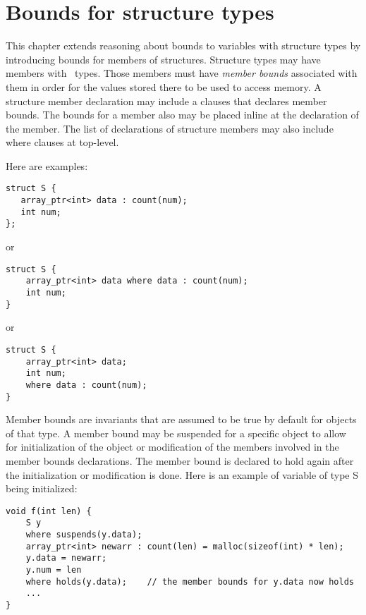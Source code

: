 
\chapter{Bounds for structure types}
\label{chapter:structure-bounds}

This chapter extends reasoning about bounds to variables with structure
types by introducing bounds for members of structures.   
Structure types may have members with \arrayptr\ types. Those
members must have \emph{member bounds} associated with them in order for
the values stored there to be used to access memory. A structure member
declaration may include a  clauses that declares member
bounds. The bounds for a member also may be placed inline at the
declaration of the member. The list of declarations of structure members
may also include where clauses at top-level. 

Here are examples:

\begin{verbatim}
struct S {
   array_ptr<int> data : count(num);
   int num;
};
\end{verbatim}

or

\begin{verbatim}
struct S {
    array_ptr<int> data where data : count(num);
    int num;
}
\end{verbatim}

or

\begin{verbatim}
struct S {
    array_ptr<int> data;
    int num;
    where data : count(num);
}
\end{verbatim}

Member bounds are invariants that are assumed to be true by default for
objects of that type. A member bound may be suspended for a specific
object to allow for initialization of the object or modification of the
members involved in the member bounds declarations. The member bound
is declared to hold again after the initialization or modification is done.
Here is an example of variable of type S being initialized:

\begin{verbatim}
void f(int len) {
    S y 
    where suspends(y.data);
    array_ptr<int> newarr : count(len) = malloc(sizeof(int) * len);
    y.data = newarr;
    y.num = len
    where holds(y.data);    // the member bounds for y.data now holds
    ...
}
\end{verbatim}

